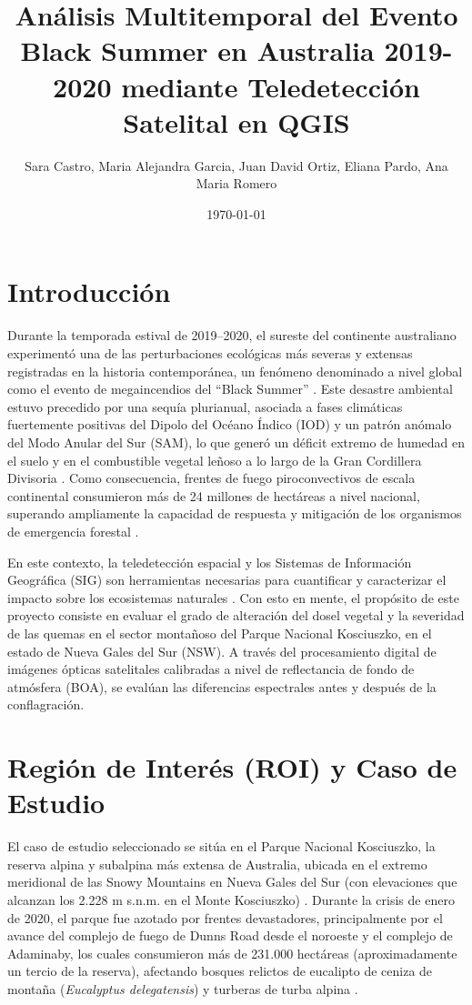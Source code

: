 \documentclass[12pt]{article}
\title{Análisis Multitemporal del Evento Black Summer en Australia 2019-2020 mediante Teledetección Satelital en QGIS}
\author{
  \small
  Sara Castro, Maria Alejandra Garcia, Juan David Ortiz, Eliana Pardo, Ana Maria Romero
}
\date{\today}
\begin{document}
\maketitle

\section{Introducción}
Durante la temporada estival de 2019--2020, el sureste del continente australiano experimentó una de las perturbaciones ecológicas más severas y extensas registradas en la historia contemporánea, un fenómeno denominado a nivel global como el evento de megaincendios del ``Black Summer'' \cite{boM2020blacksummer}. Este desastre ambiental estuvo precedido por una sequía plurianual, asociada a fases climáticas fuertemente positivas del Dipolo del Océano Índico (IOD) y un patrón anómalo del Modo Anular del Sur (SAM), lo que generó un déficit extremo de humedad en el suelo y en el combustible vegetal leñoso a lo largo de la Gran Cordillera Divisoria \cite{abatzoglou2021anthropogenic}. Como consecuencia, frentes de fuego piroconvectivos de escala continental consumieron más de 24 millones de hectáreas a nivel nacional, superando ampliamente la capacidad de respuesta y mitigación de los organismos de emergencia forestal \cite{filkov2020impact}.

En este contexto, la teledetección espacial y los Sistemas de Información Geográfica (SIG) son herramientas necesarias para cuantificar y caracterizar el impacto sobre los ecosistemas naturales \cite{lillesand2015remote}. Con esto en mente, el propósito de este proyecto consiste en evaluar el grado de alteración del dosel vegetal y la severidad de las quemas en el sector montañoso del Parque Nacional Kosciuszko, en el estado de Nueva Gales del Sur (NSW). A través del procesamiento digital de imágenes ópticas satelitales calibradas a nivel de reflectancia de fondo de atmósfera (BOA), se evalúan las diferencias espectrales antes y después de la conflagración.

\section{Región de Interés (ROI) y Caso de Estudio}
El caso de estudio seleccionado se sitúa en el Parque Nacional Kosciuszko, la reserva alpina y subalpina más extensa de Australia, ubicada en el extremo meridional de las Snowy Mountains en Nueva Gales del Sur (con elevaciones que alcanzan los 2.228 m s.n.m. en el Monte Kosciuszko) \cite{nsw2020kosciuszko}. Durante la crisis de enero de 2020, el parque fue azotado por frentes devastadores, principalmente por el avance del complejo de fuego de Dunns Road desde el noroeste y el complejo de Adaminaby, los cuales consumieron más de 231.000 hectáreas (aproximadamente un tercio de la reserva), afectando bosques relictos de eucalipto de ceniza de montaña (\textit{Eucalyptus delegatensis}) y turberas de turba alpina \cite{dpie2020firesevr}.
\end{document}
